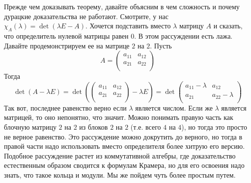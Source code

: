 Прежде чем доказывать теорему, давайте объясним в чем сложность и почему дурацкие доказательства не работают.
Смотрите, у нас $\chi_A(\lambda) = \det(\lambda E - A)$.
Хочется подставить вместо $\lambda$ матрицу $A$ и сказать, что определитель нулевой матрицы равен $0$.
В этом рассуждении есть лажа.
Давайте продемонстрируем ее на матрице $2$ на $2$.
Пусть
\[
A = 
\begin{pmatrix}
{a_{11}}&{a_{12}}\\
{a_{21}}&{a_{22}}\\
\end{pmatrix}
\]
Тогда
\[
\det(A-\lambda E) =
\det
\left(
\begin{pmatrix}
{a_{11}}&{a_{12}}\\
{a_{21}}&{a_{22}}\\
\end{pmatrix}
-\lambda E
\right)=
\det 
\begin{pmatrix}
{a_{11}-\lambda}&{a_{12}}\\
{a_{21}}&{a_{22}-\lambda}\\
\end{pmatrix}
\]
Так вот, последнее равенство верно если $\lambda$ является числом.
Если же $\lambda$ является матрицей, то оно непонятно, что значит.
Можно понимать правую часть как блочную матрицу $2$ на $2$ из блоков $2$ на $2$ (т.е. всего $4$ на $4$), но тогда это просто не верное равенство.
Это рассуждение можно докрутить до верного, но тогда в правой части надо использовать вместо определителя более хитрую его версию.
Подобное рассуждение растет из коммутативной алгебры, где доказательство естественным образом сводится к формулам Крамера, но для его освоения надо знать, что такое кольца и модули.
Мы же пойдем чуть более простым путем.

